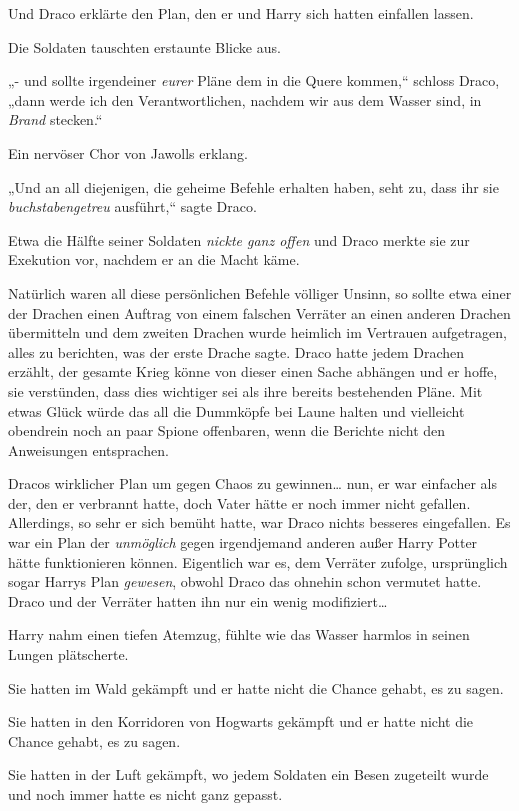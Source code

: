 {Und Draco erklärte den Plan, den er und Harry sich hatten einfallen lassen.

Die Soldaten tauschten erstaunte Blicke aus.

„- und sollte irgendeiner \emph{eurer} Pläne dem in die Quere kommen,“ schloss Draco, „dann werde ich den Verantwortlichen, nachdem wir aus dem Wasser sind, in \emph{Brand} stecken.“

Ein nervöser Chor von Jawolls erklang.

„Und an all diejenigen, die geheime Befehle erhalten haben, seht zu, dass ihr sie \emph{buchstabengetreu} ausführt,“ sagte Draco.

Etwa die Hälfte seiner Soldaten \emph{nickte ganz offen} und Draco merkte sie zur Exekution vor, nachdem er an die Macht käme.

Natürlich waren all diese persönlichen Befehle völliger Unsinn, so sollte etwa einer der Drachen einen Auftrag von einem falschen Verräter an einen anderen Drachen übermitteln und dem zweiten Drachen wurde heimlich im Vertrauen aufgetragen, alles zu berichten, was der erste Drache sagte. Draco hatte jedem Drachen erzählt, der gesamte Krieg könne von dieser einen Sache abhängen und er hoffe, sie verstünden, dass dies wichtiger sei als ihre bereits bestehenden Pläne. Mit etwas Glück würde das all die Dummköpfe bei Laune halten und vielleicht obendrein noch an paar Spione offenbaren, wenn die Berichte nicht den Anweisungen entsprachen.

Dracos wirklicher Plan um gegen Chaos zu gewinnen… nun, er war einfacher als der, den er verbrannt hatte, doch Vater hätte er noch immer nicht gefallen. Allerdings, so sehr er sich bemüht hatte, war Draco nichts besseres eingefallen. Es war ein Plan der \emph{unmöglich} gegen irgendjemand anderen außer Harry Potter hätte funktionieren können. Eigentlich war es, dem Verräter zufolge, ursprünglich sogar Harrys Plan \emph{gewesen}, obwohl Draco das ohnehin schon vermutet hatte. Draco und der Verräter hatten ihn nur ein wenig modifiziert…

\later

Harry nahm einen tiefen Atemzug, fühlte wie das Wasser harmlos in seinen Lungen plätscherte.

Sie hatten im Wald gekämpft und er hatte nicht die Chance gehabt, es zu sagen.

Sie hatten in den Korridoren von Hogwarts gekämpft und er hatte nicht die Chance gehabt, es zu sagen.

Sie hatten in der Luft gekämpft, wo jedem Soldaten ein Besen zugeteilt wurde und noch immer hatte es nicht ganz gepasst.

}
